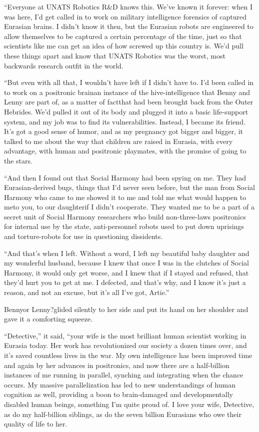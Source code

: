 “Everyone at UNATS Robotics R\&D knows this. We’ve known it
forever: when I was here, I’d get called in to work on military
intelligence forensics of captured Eurasian brains. I didn’t know
it then, but the Eurasian robots are engineered to allow themselves
to be captured a certain percentage of the time, just so that
scientists like me can get an idea of how screwed up this country
is. We’d pull these things apart and know that UNATS Robotics was
the worst, most backwards research outfit in the world.

“But even with all that, I wouldn’t have left if I didn’t have to.
I’d been called in to work on a positronic brain{\dash}an instance of the
hive-intelligence that Benny and Lenny are part of, as a matter of
fact{\dash}that had been brought back from the Outer Hebrides. We’d
pulled it out of its body and plugged it into a basic life-support
system, and my job was to find its vulnerabilities. Instead, I
became its friend. It’s got a good sense of humor, and as my
pregnancy got bigger and bigger, it talked to me about the way that
children are raised in Eurasia, with every advantage, with human
and positronic playmates, with the promise of going to the stars.

“And then I found out that Social Harmony had been spying on me.
They had Eurasian-derived bugs, things that I’d never seen before,
but the man from Social Harmony who came to me showed it to me and
told me what would happen to me{\dash}to you, to our daughter{\dash}if I didn’t
cooperate. They wanted me to be a part of a secret unit of Social
Harmony researchers who build non-three-laws positronics for
internal use by the state, anti-personnel robots used to put down
uprisings and torture-robots for use in questioning dissidents.

“And that’s when I left. Without a word, I left my beautiful baby
daughter and my wonderful husband, because I knew that once I was
in the clutches of Social Harmony, it would only get worse, and I
knew that if I stayed and refused, that they’d hurt you to get at
me. I defected, and that’s why, and I know it’s just a reason, and
not an excuse, but it’s all I’ve got, Artie.”

Benny{\dash}or Lenny?{\dash}glided silently to her side and put its hand on her
shoulder and gave it a comforting squeeze.

“Detective,” it said, “your wife is the most brilliant human
scientist working in Eurasia today. Her work has revolutionized our
society a dozen times over, and it’s saved countless lives in the
war. My own intelligence has been improved time and again by her
advances in positronics, and now there are a half-billion instances
of me running in parallel, synching and integrating when the chance
occurs. My massive parallelization has led to new understandings of
human cognition as well, providing a boon to brain-damaged and
developmentally disabled human beings, something I’m quite proud
of. I love your wife, Detective, as do my half-billion siblings, as
do the seven billion Eurasians who owe their quality of life to
her.

